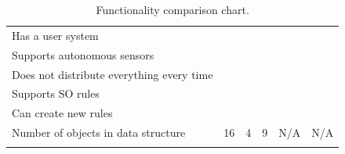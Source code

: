 \begin{longtable}{m|m|m|m|m|m}
	\multicolumn{1}{p{5cm}|}{Has a user system} & \checkmark &  &  & & \\
	\multicolumn{1}{p{5cm}|}{Supports autonomous sensors} & \checkmark &  &  & & \\
	\multicolumn{1}{p{5cm}|}{Does not distribute everything every time} & \checkmark &  & & & \\
	\multicolumn{1}{p{5cm}|}{Supports SO rules} & &  &  & \checkmark & \checkmark
	\\
	\multicolumn{1}{p{5cm}|}{Can create new rules} & &  &  & & \\
	\multicolumn{1}{p{5cm}|}{Number of objects in data structure} & 16 & 4
	& 9 & N/A & N/A \\
	\hline
  
  \caption{Functionality comparison chart.}
  \label{tab:comparisonChart}
\end{longtable}
\endgroup
